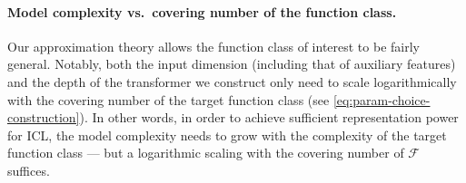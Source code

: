 \documentclass[english]{article}
\begin{document}

\paragraph{Model complexity vs.~covering number of the function class.} 
Our approximation theory allows the function class of interest to be fairly general. Notably, both the input dimension (including that of auxiliary features) and the depth of the transformer we construct only need to 
scale logarithmically with the covering number of the target function class (see \eqref{eq:param-choice-construction}). In other words, in order to achieve sufficient representation power for ICL, the model complexity needs to grow with the complexity of the target function class --- but a logarithmic scaling with the covering number of $\mathcal{F}$ suffices. 
     
\end{document}
